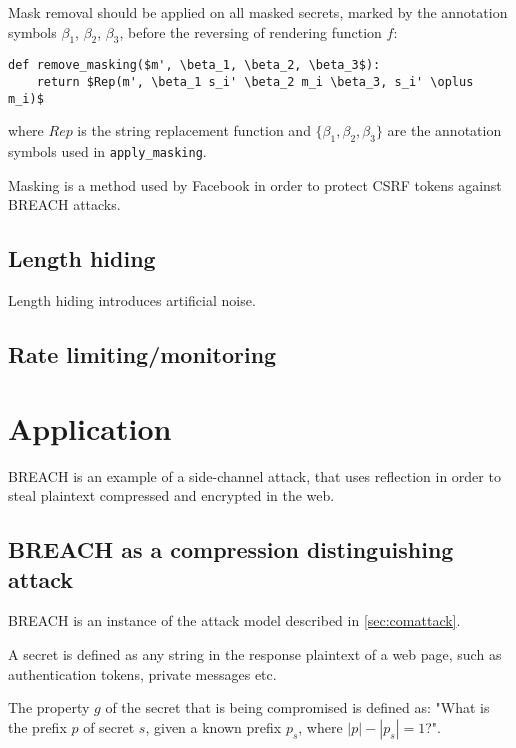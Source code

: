 \documentclass{sig-alternate-05-2015}
\begin{document}
Mask removal should be applied on all masked secrets, marked by the annotation
symbols $\beta_1$, $\beta_2$, $\beta_3$, before the reversing of rendering function $f$:

\begin{lstlisting}[texcl,mathescape]
def remove_masking($m', \beta_1, \beta_2, \beta_3$):
    return $Rep(m', \beta_1 s_i' \beta_2 m_i \beta_3, s_i' \oplus m_i)$
\end{lstlisting}

where $Rep$ is the string replacement function and $\{\beta_1, \beta_2,
\beta_3\}$ are the annotation symbols used in \texttt{apply\_masking}.

Masking is a method used by Facebook \cite{c2} in order to protect CSRF tokens
against BREACH attacks.

\subsection{Length hiding}\label{subsec:noise}
Length hiding introduces artificial noise.

\subsection{Rate limiting/monitoring}\label{subsec:monitoring}

\section{Application}\label{sec:application}

BREACH \cite{c3} is an example of a side-channel attack, that uses reflection in
order to steal plaintext compressed and encrypted in the web.

\subsection{BREACH as a compression distinguishing
attack}\label{subsec:breachapp}
BREACH is an instance of the attack model described in \ref{sec:comattack}.

A secret is defined as any string in the response plaintext of a web page, such
as authentication tokens, private messages etc.

The property $g$ of the secret that is being compromised is defined as: "What is
the prefix $p$ of secret $s$, given a known prefix $p_s$, where $|p| - |p_s| =
1$?".
\end{document}
